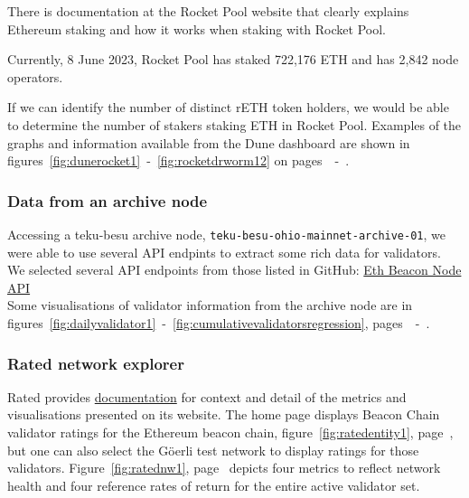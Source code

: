 \documentclass[UTF8]{article}
\begin{document}
There is documentation at the Rocket Pool website that clearly explains Ethereum staking and how it works when staking with Rocket Pool.

Currently, 8 June 2023, Rocket Pool has staked 722,176 ETH and has 2,842 node operators.

If we can identify the number of distinct rETH token holders, we would be able to determine the number of stakers staking ETH in Rocket Pool. 
Examples of the graphs and information available from the Dune dashboard are shown in figures~\ref{fig:dunerocket1}~-~\ref{fig:rocketdrworm12} on pages~\pageref{fig:dunerocket1}~-~\pageref{fig:rocketdrworm12}.

\subsubsection*{Data from an archive node}
Accessing a teku-besu archive node, \texttt{teku-besu-ohio-mainnet-archive-01},  we were able to use several API endpints to extract some rich data for validators.\\
	 We selected several API endpoints from those listed in GitHub: \href{https://ethereum.github.io/beacon-APIs/?urls.primaryName=dev}{Eth Beacon Node API}\\
	 Some visualisations of validator information from the archive node are in figures~\ref{fig:dailyvalidator1}~-~\ref{fig:cumulativevalidatorsregression}, pages~\pageref{fig:dailyvalidator1}~-~\pageref{fig:cumulativevalidatorsregression}.
	 
\subsubsection*{Rated network explorer}
Rated provides \href{https://docs.rated.network}{documentation} for context and detail of the metrics and visualisations presented on its website.
	 The home page displays Beacon Chain validator ratings for the Ethereum beacon chain, figure~\ref{fig:ratedentity1}, page~\pageref{fig:ratedentity1}, but one can also select the G\"oerli test network to display ratings for those validators.
Figure~\ref{fig:ratednw1}, page~\pageref{fig:ratednw1} depicts four metrics to reflect network health and four reference rates of return for the entire active validator set.


\end{document}
